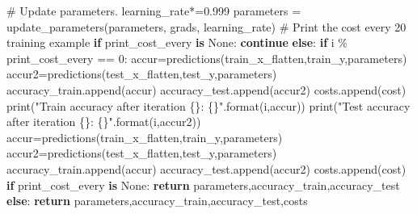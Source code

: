 \documentclass[
  letterpaper,
  DIV=11,
  numbers=noendperiod]{scrartcl}
\newenvironment{Shaded}{\begin{snugshade}}{\end{snugshade}}
\newcommand{\BuiltInTok}[1]{\textcolor[rgb]{0.00,0.23,0.31}{#1}}
\newcommand{\CommentTok}[1]{\textcolor[rgb]{0.37,0.37,0.37}{#1}}
\newcommand{\ControlFlowTok}[1]{\textcolor[rgb]{0.00,0.23,0.31}{\textbf{#1}}}
\newcommand{\DecValTok}[1]{\textcolor[rgb]{0.68,0.00,0.00}{#1}}
\newcommand{\FloatTok}[1]{\textcolor[rgb]{0.68,0.00,0.00}{#1}}
\newcommand{\KeywordTok}[1]{\textcolor[rgb]{0.00,0.23,0.31}{\textbf{#1}}}
\newcommand{\NormalTok}[1]{\textcolor[rgb]{0.00,0.23,0.31}{#1}}
\newcommand{\OperatorTok}[1]{\textcolor[rgb]{0.37,0.37,0.37}{#1}}
\newcommand{\SpecialCharTok}[1]{\textcolor[rgb]{0.37,0.37,0.37}{#1}}
\newcommand{\StringTok}[1]{\textcolor[rgb]{0.13,0.47,0.30}{#1}}
\newcommand{\VariableTok}[1]{\textcolor[rgb]{0.07,0.07,0.07}{#1}}
\begin{document}
\begin{Shaded}
\begin{Highlighting}[]
        \CommentTok{\# Update parameters.}
\NormalTok{        learning\_rate}\OperatorTok{*=}\FloatTok{0.999}
\NormalTok{        parameters }\OperatorTok{=}\NormalTok{ update\_parameters(parameters, grads, learning\_rate)}
        \CommentTok{\# Print the cost every 20 training example}
        \ControlFlowTok{if}\NormalTok{ print\_cost\_every }\KeywordTok{is} \VariableTok{None}\NormalTok{:}
            \ControlFlowTok{continue}
        \ControlFlowTok{else}\NormalTok{:}
            \ControlFlowTok{if}\NormalTok{ i }\OperatorTok{\%}\NormalTok{ print\_cost\_every }\OperatorTok{==} \DecValTok{0}\NormalTok{:}
\NormalTok{                accur}\OperatorTok{=}\NormalTok{predictions(train\_x\_flatten,train\_y,parameters)}
\NormalTok{                accur2}\OperatorTok{=}\NormalTok{predictions(test\_x\_flatten,test\_y,parameters)}
\NormalTok{                accuracy\_train.append(accur)}
\NormalTok{                accuracy\_test.append(accur2)}
\NormalTok{                costs.append(cost)}
                \BuiltInTok{print}\NormalTok{(}\StringTok{"Train accuracy after iteration }\SpecialCharTok{\{\}}\StringTok{: }\SpecialCharTok{\{\}}\StringTok{"}\NormalTok{.}\BuiltInTok{format}\NormalTok{(i,accur))}
                \BuiltInTok{print}\NormalTok{(}\StringTok{"Test accuracy after iteration }\SpecialCharTok{\{\}}\StringTok{: }\SpecialCharTok{\{\}}\StringTok{"}\NormalTok{.}\BuiltInTok{format}\NormalTok{(i,accur2))}
\NormalTok{    accur}\OperatorTok{=}\NormalTok{predictions(train\_x\_flatten,train\_y,parameters)}
\NormalTok{    accur2}\OperatorTok{=}\NormalTok{predictions(test\_x\_flatten,test\_y,parameters)}
\NormalTok{    accuracy\_train.append(accur)}
\NormalTok{    accuracy\_test.append(accur2)}
\NormalTok{    costs.append(cost)}
    \ControlFlowTok{if}\NormalTok{ print\_cost\_every }\KeywordTok{is} \VariableTok{None}\NormalTok{:}
        \ControlFlowTok{return}\NormalTok{ parameters,accuracy\_train,accuracy\_test}
    \ControlFlowTok{else}\NormalTok{:}
        \ControlFlowTok{return}\NormalTok{ parameters,accuracy\_train,accuracy\_test,costs}
\end{Highlighting}
\end{Shaded}
\end{document}
